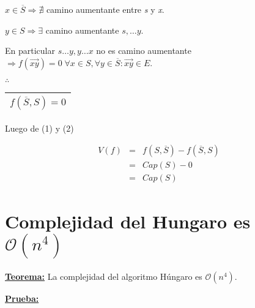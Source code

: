 \documentclass[12pt,a4paper]{report}
\begin{document}
\begin{enumerate}[(1)]
				$x \in \overline{S} \Rightarrow \nexists$ camino aumentante entre \textit{s} y \textit{x}.

				$y \in S \Rightarrow \exists$ camino aumentante $ s, \dotsc y$.

				En particular $s \dotsc y, y \dotsc x$ no es camino aumentante $\Rightarrow f(\overrightarrow{xy}) = 0  \; \forall x \in S, \forall y \in \overline{S} : \overrightarrow{xy} \in E$.

				\vspace{3mm}
				$\therefore$ \begin{tabular}{|c|} \hline $ f(\overline{S}, S) = 0 $ \\ \hline \end{tabular}
			\end{enumerate}

			Luego de (1) y (2)

			\begin{eqnarray}
				\nonumber V(f) &=& f(S, \overline{S}) - f(\overline{S}, S)\\
				\nonumber &=& Cap(S) - 0 \\
				\nonumber &=& Cap(S)
			\end{eqnarray}

	\section{Complejidad del Hungaro es $\mathcal{O}(n^{4})$}

		\textbf{\underline{Teorema:}} La complejidad del algoritmo Húngaro es $\mathcal{O}(n^{4})$.

		\textbf{\underline{Prueba:}}
\end{document}

